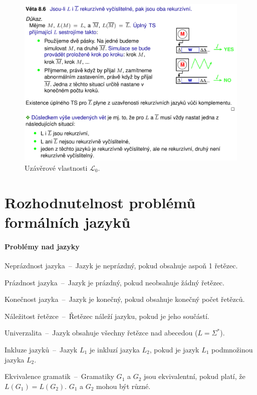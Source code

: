 \begin{figure}[H]
    \centering
    \includegraphics[width=1\linewidth]{uzaverove_vlasnosti_L0_05.pdf}
    \caption{Uzávěrové vlastnosti $\mathcal{L}_0$.}
\end{figure}


\section{Rozhodnutelnost problémů formálních jazyků}

\paragraph*{Problémy nad jazyky} \begin{compactitem}
    \item Neprázdnost jazyka~--~Jazyk je neprázdný, pokud obsahuje aspoň 1 řetězec.

    \item Prázdnost jazyka~--~Jazyk je prázdný, pokud neobsahuje žádný řetězec.

    \item Konečnost jazyka~--~Jazyk je konečný, pokud obsahuje konečný počet řetězců.

    \item Náležitost řetězce~--~Řetězec náleží jazyku, pokud je jeho součástí.

    \item Univerzalita~--~Jazyk obsahuje všechny řetězce nad abecedou ($L = \Sigma^* $).

    \item Inkluze jazyků~--~Jazyk $L_1$ je inkluzí jazyka $L_2$, pokud je jazyk $L_1$ podmnožinou jazyka $L_2$.

    \item Ekvivalence gramatik~--~Gramatiky $G_1$ a $G_2$ jsou ekvivalentní, pokud platí, že\break $L(G_1) = L(G_2)$. $G_1$ a $G_2$ mohou být různé.
\end{compactitem}

